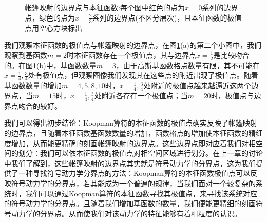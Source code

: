 \begin{figure}[!]
  \centering%
    \\
    \\
    \\
    \\
  \caption[帐篷映射的边界点与本征函数]{帐篷映射的边界点与本征函数:每个图中红色的点为$x=0$系列的边界点，绿色的点为$x=\frac{2}{3}$系列的边界点(不区分层次)，且本征函数的极值点用空心方块标出}\label{fig:Tent_eigen_noise_n1000m2d0}
\end{figure}

我们观察本征函数的极值点与帐篷映射的边界点，在图\ref{fig:Tent_eigen_noise_n1000m2d0}(a)的第二个小图中，我们观察到基函数$m=2$时本征函数存在一个极值点，其与边界点$x=\frac{1}{2}$是比较吻合的。在图\ref{fig:Tent_eigen_noise_n1000m2d0}(b)中，基函数数量$m=3$，由于高斯基函数格点数量有限，其不可能在$x=\frac{1}{4},\frac{3}{4}$处有极值点，但观察图像我们发现其在这些点的附近出现了极值点。随着基函数数量的增加$m=4,5,8,10$时，$x=\frac{1}{4},\frac{3}{4}$处附近的极值点越来越逼近这两个边界点，当$m=15$时，$x=\frac{1}{4},\frac{3}{4}$处附近各存在一个极值点；当$m=20$时，极值点与边界点吻合的较好。

我们可以得出初步结论：Koopman算符的本征函数的极值点确实反映了帐篷映射的边界点，且随着本征函数基函数数量的增加，函数格点的增加使本征函数的精细度增加，从而能更精确的刻画帐篷映射的边界点。这些边界点即对应着我们对相空间的划分：我们可以依本征函数的极值点对相空间区域进行划分。在上一章的讨论中我们了解到，这些帐篷映射的边界点其实就是符号动力学的分界点，这为我们提供了一种寻找符号动力学分界点的方法：Koopman算符的本征函数极值点可以反映符号动力学的分界点，若其能成为一个普遍的规律，当我们面对一个较复杂的系统时，我们可以通过Koopman算符的本征函数寻找其极值点，来寻找该系统对应的符号动力学的分界点。且随着我们增加基函数的数量，我们便能更精细的刻画符号动力学的分界点。从而使我们对该动力学的特征能够有着粗粒度的认识。

